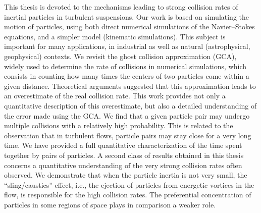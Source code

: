This thesis is devoted to the mechanisms leading to strong collision rates of inertial particles in turbulent suspensions.
Our work is based on simulating the motion of particles, using both direct numerical simulations of the Navier--Stokes equations, and a simpler model (kinematic simulations).
This subject is important for many applications, in industrial as well as natural (astrophysical, geophysical) contexts.
We revisit the ghost collision approximation (GCA), widely used to determine the rate of collisions in numerical simulations, which consists in counting how many times the centers of two particles come within a given distance.
Theoretical arguments suggested that this approximation leads to an overestimate of the real collision rate.
This work provides not only a quantitative description of this overestimate, but also a detailed understanding of the error made using the GCA.
We find that a given particle pair may undergo multiple collisions with a relatively high probability.
This is related to the observation that in turbulent flows, particle pairs may stay close for a very long time.
We have provided a full quantitative characterization of the time spent together by pairs of particles.
A second class of results obtained in this thesis concerns a quantitative understanding of the very strong collision rates often observed.
We demonstrate that when the particle inertia is not very small, the ``sling/caustics'' effect, i.e., the ejection of particles from energetic vortices in the flow, is responsible for the high collision rates.
The preferential concentration of particles in some regions of space plays in comparison a weaker role.
